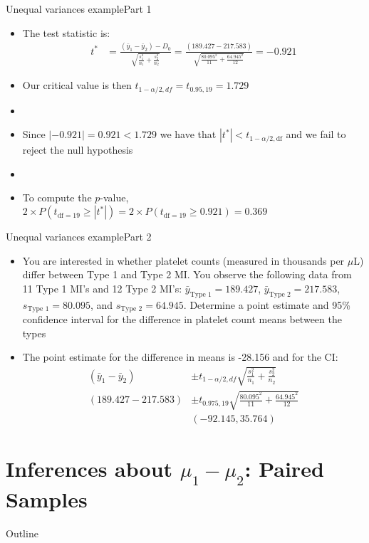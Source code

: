 \documentclass[xcolor=dvipsnames]{beamer}
\begin{document}
\begin{frame}{Unequal variances example}{Part 1}
\begin{itemize}
	\item The test statistic is: 
	\begin{align*}
	t^* &= \frac{(\bar{y}_1-\bar{y}_2)-D_0}{\sqrt{\frac{s^2_1}{n_1}+\frac{s^2_2}{n_2}}} = \frac{(189.427-217.583)}{\sqrt{\frac{80.095^2}{11}+\frac{64.945^2}{12}}} = -0.921
	\end{align*}
	\item Our critical value is then $t_{1-\alpha/2, df} = t_{0.95, 19} = 1.729$
	\item[]
	\item Since $|-0.921| = 0.921 < 1.729$ we have that $|t^*| < t_{1-\alpha / 2, \text{df}}$ and we fail to reject the null hypothesis 
	\item[]
	\item To compute the $p$-value, $2 \times P(t_{\text{df} = 19} \geq |t^*|) = 2\times P(t_{\text{df} = 19} \geq 0.921) = 0.369$
\end{itemize}
\end{frame}

\begin{frame}{Unequal variances example}{Part 2}
\begin{itemize}
	\item You are interested in whether platelet counts (measured in thousands per $\mu$L) differ between Type 1 and Type 2 MI. You observe the following data from 11 Type 1 MI's and 12 Type 2 MI's: $\bar{y}_{\text{Type 1}}=189.427$, $\bar{y}_{\text{Type 2}}=217.583$, $s_{\text{Type 1}} = 80.095$, and $s_{\text{Type 2}} = 64.945$. Determine a point estimate and 95\% confidence interval for the difference in platelet count means between the types
	\item The point estimate for the difference in means is -28.156 and for the CI:
	\begin{align*}
	(\bar{y}_1-\bar{y}_2) &\pm t_{1-\alpha / 2, df} \sqrt{\frac{s_1^2}{n_1}+\frac{s_2^2}{n_2}} \\
	(189.427-217.583) &\pm t_{0.975,19} \sqrt{\frac{80.095^2}{11}+\frac{64.945^2}{12}} \\
	& (-92.145, 35.764)
	\end{align*}
\end{itemize}
\end{frame}

\section{Inferences about $\mu_1 - \mu_2$: Paired Samples}
\begin{frame}{Outline}
\tableofcontents[currentsection,subsectionstyle=show/shaded/hide]
\end{frame}
\end{document}
